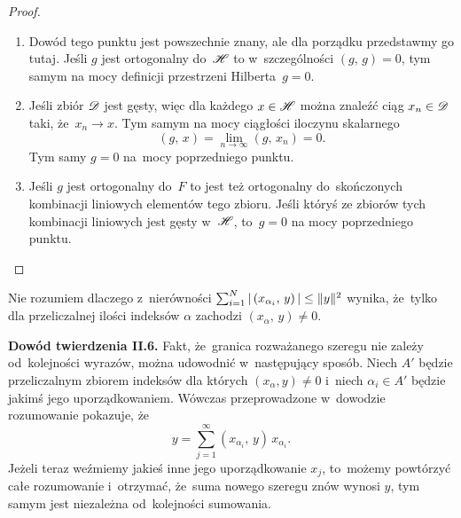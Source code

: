 \documentclass[a4paper,11pt]{article}
\begin{document}
\begin{proof}

  \begin{enumerate}
  \item Dowód tego punktu jest powszechnie znany, ale dla porządku
    przedstawmy go tutaj. Jeśli $g$ jest ortogonalny do~$\mathcal{H}$ to
    w~szczególności $( g, \, g ) = 0$, tym samym na mocy definicji
    przestrzeni Hilberta~$g = 0$.

  \item Jeśli zbiór $\mathcal{D}$ jest gęsty, więc dla każdego $x \in \mathcal{H}$
    można znaleźć ciąg $x_{ n } \in \mathcal{D}$ taki, że~$x_{ n } \to x$. Tym
    samym na mocy ciągłości iloczynu skalarnego
    \begin{equation}
      \label{eq:RS-Vol-I-s01-18}
      ( g, \, x ) = \lim_{ n \to \infty } ( g, \, x_{ n } ) = 0.
    \end{equation}
    Tym samy $g = 0$ na~mocy poprzedniego punktu.

  \item Jeśli $g$ jest ortogonalny do~$F$ to jest też ortogonalny
    do~skończonych kombinacji liniowych elementów tego zbioru. Jeśli
    któryś ze zbiorów tych kombinacji liniowych jest gęsty w~$\mathcal{H}$,
    to~$g = 0$ na mocy poprzedniego punktu.

  \end{enumerate}

\end{proof}

\vspace{\spaceFour}



\start {} Nie rozumiem dlaczego z~nierówności
$\sum_{ i = 1 }^{ N } |\, {  ( x_{ \alpha_{ i } }, \,  y )  } \,| \leq \lVert{ 
  y  }\rVert^{ 2 }$ wynika, że~tylko dla przeliczalnej ilości indeksów $\alpha$
zachodzi $( x_{ \alpha }, \, y ) \neq 0$. \Dok

\vspace{\spaceFour}



\start {} \textbf{Dowód twierdzenia II.6.} Fakt, że~granica
rozważanego szeregu nie zależy od~kolejności wyrazów, można udowodnić
w~następujący sposób. Niech $A'$ będzie przeliczalnym zbiorem indeksów
dla których $( x_{ \alpha }, y ) \neq 0$ i~niech $\alpha_{ i } \in A'$
będzie jakimś jego uporządkowaniem. Wówczas przeprowadzone w~dowodzie
rozumowanie pokazuje, że
\begin{equation}
  \label{eq:RS-Vol-I-s01-19}
  y = \sum_{ j = 1 }^{ \infty } ( x_{ \alpha_{ i } }, \, y ) \, x_{ \alpha_{ i } }.
\end{equation}
Jeżeli teraz weźmiemy jakieś inne jego uporządkowanie $x_{ j }$,
to~możemy powtórzyć całe rozumowanie i~otrzymać, że~suma nowego
szeregu znów wynosi $y$, tym samym jest niezależna od~kolejności
sumowania.
\end{document}
